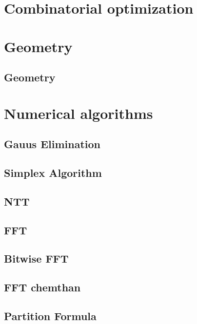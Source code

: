\section{Combinatorial optimization}

\section{Geometry}
\subsection{Geometry}
\raggedbottom
\hrulefill

\section{Numerical algorithms}
\subsection{Gauus Elimination}
\raggedbottom
\hrulefill
\subsection{Simplex Algorithm}
\raggedbottom
\hrulefill
\subsection{NTT}
\raggedbottom
\hrulefill
\subsection{FFT}
\raggedbottom
\hrulefill
\subsection{Bitwise FFT}
\raggedbottom
\hrulefill
\subsection{FFT chemthan}
\raggedbottom
\hrulefill
\subsection{Partition Formula}
\raggedbottom
\hrulefill
